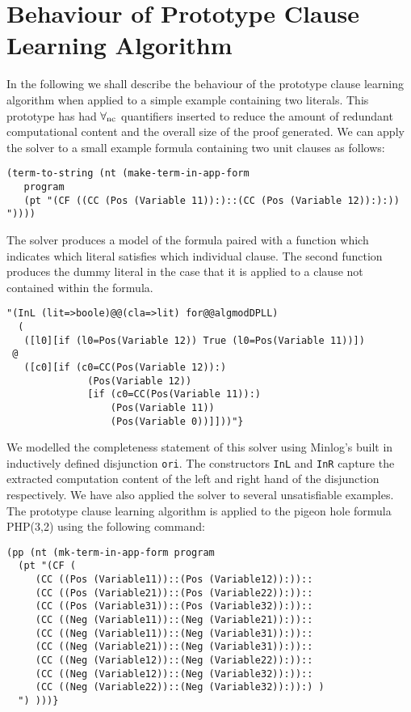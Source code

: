 \section{Behaviour of Prototype Clause Learning Algorithm}
In the following we shall describe the behaviour of the prototype clause learning algorithm when applied to a simple example containing two literals. This prototype has had $\forall_{\mathrm{nc}}$ quantifiers inserted to reduce the amount of redundant computational content and the overall size of the proof generated. We can apply the solver to a small example formula containing two unit clauses as follows:
\begin{lstlisting}
(term-to-string (nt (make-term-in-app-form 
   program 
   (pt "(CF ((CC (Pos (Variable 11)):)::(CC (Pos (Variable 12)):):)) 
"))))
\end{lstlisting}
The solver produces a model of the formula paired with a function which indicates which literal satisfies which individual clause. The second function produces the dummy literal in the case that it is applied to a clause not contained within the formula.

\begin{lstlisting}
"(InL (lit=>boole)@@(cla=>lit) for@@algmodDPLL)
  (
   ([l0][if (l0=Pos(Variable 12)) True (l0=Pos(Variable 11))])
 @
   ([c0][if (c0=CC(Pos(Variable 12)):) 
              (Pos(Variable 12))
              [if (c0=CC(Pos(Variable 11)):) 
                  (Pos(Variable 11)) 
                  (Pos(Variable 0))]]))"}                                                                     
\end{lstlisting}

We modelled the completeness statement of this solver using Minlog's built in inductively defined disjunction \texttt{ori}. The constructors \texttt{InL} and \texttt{InR} capture the extracted computation content of the left and right hand of the disjunction respectively. We have also applied the solver to several unsatisfiable examples. The prototype clause learning algorithm is applied to the pigeon hole formula PHP(3,2) using the following command:

\begin{lstlisting}
(pp (nt (mk-term-in-app-form program 
  (pt "(CF (                                                                
     (CC ((Pos (Variable11))::(Pos (Variable12)):))::
     (CC ((Pos (Variable21))::(Pos (Variable22)):))::
     (CC ((Pos (Variable31))::(Pos (Variable32)):))::
     (CC ((Neg (Variable11))::(Neg (Variable21)):))::
     (CC ((Neg (Variable11))::(Neg (Variable31)):))::
     (CC ((Neg (Variable21))::(Neg (Variable31)):))::
     (CC ((Neg (Variable12))::(Neg (Variable22)):))::
     (CC ((Neg (Variable12))::(Neg (Variable32)):))::
     (CC ((Neg (Variable22))::(Neg (Variable32)):)):) )
  ") )))}
\end{lstlisting}

